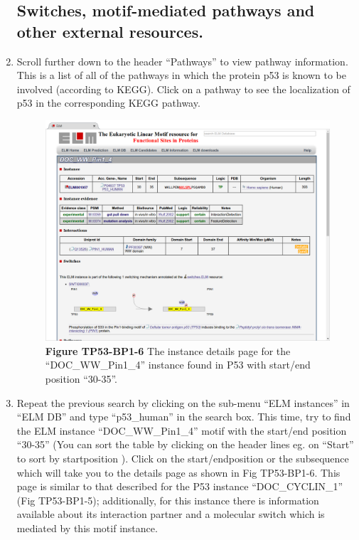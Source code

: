 \begin{enumerate}
%
%
\subsection{Switches, motif-mediated pathways and other external resources.}
\label{subsec:explore_content_external_resoureces}

\item Scroll further down to the header ``Pathways'' to view pathway
	information. This is a list of all of the pathways in which the protein
	p53 is known to be involved (according to KEGG). Click on a pathway to
	see the localization of p53 in the corresponding KEGG pathway.

\begin{figure}[h!]
	\centering
	\includegraphics[width=\textwidth]{Figures/TP53_1/doc_ww_pin_1_4_instance.png}
	\caption{
	\textbf{Figure TP53-BP1-6}
	The instance details page for the
	``DOC\_WW\_Pin1\_4'' instance found in P53 with start/end position
	``30-35''.
	}
	\label{fig:explore_content_doc_ww_instance}
\end{figure}

\item Repeat the previous search by clicking on the sub-menu ``ELM instances''
	in ``ELM DB'' and type ``p53\_human'' in the search box.  This time,
	try to find the ELM instance ``DOC\_WW\_Pin1\_4'' motif with the
	start/end position ``30-35'' (You can sort the table by clicking on the
	header lines eg. on ``Start'' to sort by startposition ). Click on the
	start/endposition or the subsequence which will take you to the details
	page as shown in Fig TP53-BP1-6. This page is similar to that described
	for the P53 instance ``DOC\_CYCLIN\_1'' (Fig TP53-BP1-5); additionally,
	for this instance there is information available about its interaction
	partner and a molecular switch which is mediated by this motif
	instance.


\end{enumerate}
